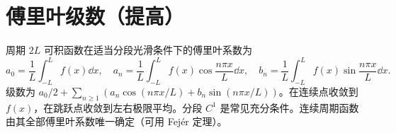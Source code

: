 \section{傅里叶级数（提高）}
周期 $2L$ 可积函数在适当分段光滑条件下的傅里叶系数为
\[
a_0=\frac1L\int_{-L}^{L}f(x)\dd x,\quad
a_n=\frac1L\int_{-L}^{L}f(x)\cos\frac{n\pi x}L\dd x,\quad
b_n=\frac1L\int_{-L}^{L}f(x)\sin\frac{n\pi x}L\dd x.
\]
级数为 $a_0/2+\sum_{n\ge1}(a_n\cos(n\pi x/L)+b_n\sin(n\pi x/L))$。在连续点收敛到 $f(x)$，在跳跃点收敛到左右极限平均。分段 $C^1$ 是常见充分条件。连续周期函数由其全部傅里叶系数唯一确定（可用 Fejér 定理）。
